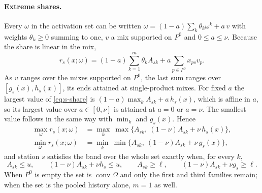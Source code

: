 \documentclass[11pt]{article}
\begin{document}
\paragraph{Extreme shares.} Every $\omega$ in the activation set can be written $\omega=(1-a)\sum_{k}\theta_k\omega^k+a\,v$ with weights $\theta_k\ge0$ summing to one, $v$ a mix supported on $P^0$ and $0\le a\le\nu$. Because the share is linear in the mix,
\begin{equation}
r_s(x;\omega)=(1-a)\sum_{k=1}^{m}\theta_k A_{sk}+a\sum_{p\in P^0}x_{ps}v_p. \label{eq:s-share}
\end{equation}
As $v$ ranges over the mixes supported on $P^0$, the last sum ranges over $[g_s(x),h_s(x)]$, its ends attained at single-product mixes. For fixed $a$ the largest value of \eqref{eq:s-share} is $(1-a)\max_kA_{sk}+a\,h_s(x)$, which is affine in $a$, so its largest value over $a\in[0,\nu]$ is attained at $a=0$ or $a=\nu$. The smallest value follows in the same way with $\min_k$ and $g_s(x)$. Hence
\begin{align}
\max_{\omega}r_s(x;\omega)&=\max_k\ \max\{A_{sk},\ (1-\nu)A_{sk}+\nu\,h_s(x)\}, \label{eq:s-max}\\
\min_{\omega}r_s(x;\omega)&=\min_k\ \min\{A_{sk},\ (1-\nu)A_{sk}+\nu\,g_s(x)\}, \label{eq:s-min}
\end{align}
and station $s$ satisfies the band over the whole set exactly when, for every $k$,
\begin{equation}
A_{sk}\le u,\qquad (1-\nu)A_{sk}+\nu h_s\le u,\qquad A_{sk}\ge\ell,\qquad (1-\nu)A_{sk}+\nu g_s\ge\ell. \label{eq:s-rows}
\end{equation}
When $P^0$ is empty the set is $\operatorname{conv}\Omega$ and only the first and third families remain; when the set is the pooled history alone, $m=1$ as well.
\end{document}
